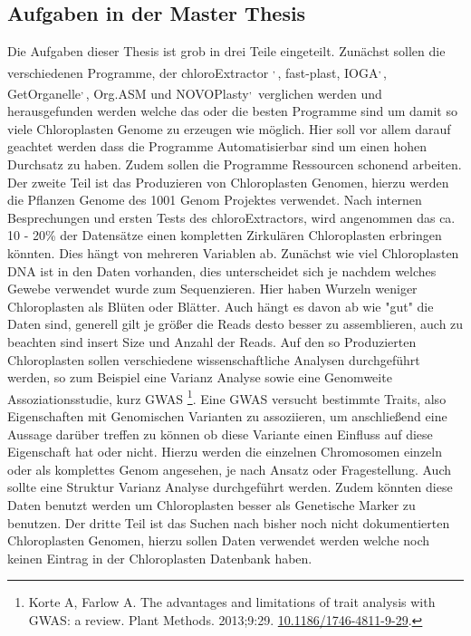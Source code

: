 \documentclass{scrartcl}
\begin{document}
\subsection{Aufgaben in der Master Thesis}
\label{sec-2-7}
Die Aufgaben dieser Thesis ist grob in drei Teile eingeteilt. Zunächst sollen die verschiedenen Programme, der chloroExtractor \footnotemark[15]{}\textsuperscript{,}\,\footnotemark[16]{}, fast-plast\footnotemark[21]{}, IOGA\footnotemark[29]{}\textsuperscript{,}\,\footnotemark[30]{}, GetOrganelle\footnotemark[27]{}\textsuperscript{,}\,\footnotemark[28]{},
Org.ASM \footnotemark[24]{}und NOVOPlasty\footnotemark[22]{}\textsuperscript{,}\,\footnotemark[23]{} verglichen werden und herausgefunden werden welche das oder die besten Programme sind um damit so viele Chloroplasten Genome zu erzeugen wie 
möglich. Hier soll vor allem darauf geachtet werden dass die Programme Automatisierbar sind um einen hohen Durchsatz zu haben. Zudem sollen die Programme Ressourcen schonend arbeiten. 
Der zweite Teil ist das Produzieren von Chloroplasten Genomen, hierzu werden die Pflanzen Genome des 1001 Genom Projektes verwendet. Nach internen Besprechungen und ersten Tests des chloroExtractors,
wird angenommen das ca. 10 - 20\% der Datensätze einen kompletten Zirkulären Chloroplasten erbringen könnten. Dies hängt von mehreren Variablen ab. Zunächst wie viel Chloroplasten DNA ist in den Daten vorhanden, dies
unterscheidet sich je nachdem welches Gewebe verwendet wurde zum Sequenzieren. Hier haben Wurzeln weniger Chloroplasten als Blüten oder Blätter. Auch hängt es davon ab wie "gut" die Daten sind, generell gilt je 
größer die Reads desto besser zu assemblieren, auch zu beachten sind insert Size und Anzahl der Reads.
Auf den so Produzierten Chloroplasten sollen verschiedene wissenschaftliche Analysen durchgeführt werden, so zum Beispiel eine Varianz Analyse sowie eine Genomweite Assoziationsstudie, kurz GWAS \footnote{Korte A, Farlow A. The advantages and limitations of trait analysis with GWAS: a review. Plant Methods. 2013;9:29. \url{10.1186/1746-4811-9-29}.}.
Eine GWAS versucht bestimmte Traits, also Eigenschaften mit Genomischen Varianten zu assoziieren, um anschließend eine Aussage darüber treffen zu können ob diese Variante einen Einfluss auf diese 
Eigenschaft hat oder nicht. Hierzu werden die einzelnen Chromosomen einzeln oder als komplettes Genom angesehen, je nach Ansatz oder Fragestellung.
Auch sollte eine Struktur Varianz Analyse durchgeführt werden. Zudem könnten diese Daten benutzt werden um Chloroplasten besser als Genetische Marker zu benutzen. 
Der dritte Teil ist das Suchen nach bisher noch nicht dokumentierten Chloroplasten Genomen, hierzu sollen Daten verwendet werden welche noch keinen Eintrag in der Chloroplasten Datenbank haben.
\end{document}

